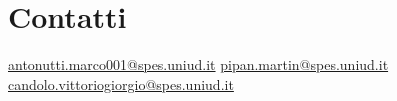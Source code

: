\documentclass{article}
\begin{document}
\vspace{15cm}
\section*{Contatti}
\href{mailto:antonutti.marco001@spes.uniud.it}{antonutti.marco001@spes.uniud.it}
\newline
\newline
\href{mailto:pipan.martin@spes.uniud.it}{pipan.martin@spes.uniud.it}
\newline
\newline
\href{mailto:candolo.vittoriogiorgio@spes.uniud.it}{candolo.vittoriogiorgio@spes.uniud.it}
\end{document}
